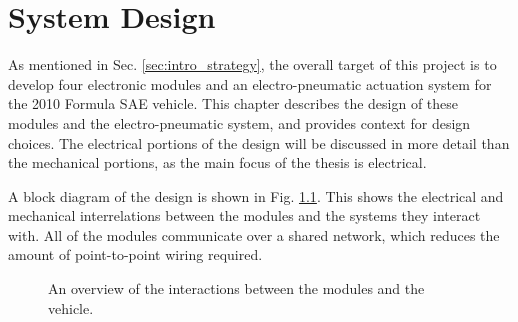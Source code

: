 \chapter{System Design\label{cha:design}}

As mentioned in Sec. \ref{sec:intro_strategy}, the overall target of this project is to develop four electronic modules and an electro-pneumatic actuation system for the 2010 Formula SAE vehicle. This chapter describes the design of these modules and the electro-pneumatic system, and provides context for design choices. The electrical portions of the design will be discussed in more detail than the mechanical portions, as the main focus of the thesis is electrical. 

A block diagram of the design is shown in Fig. \ref{fig:design_overview}. This shows the electrical and mechanical interrelations between the modules and the systems they interact with. All of the modules communicate over a shared network, which reduces the amount of point-to-point wiring required.

\begin{figure}[H]
	\centering
%	
	\caption{An overview of the interactions between the modules and the vehicle.}
	\label{fig:design_overview}
\end{figure}






